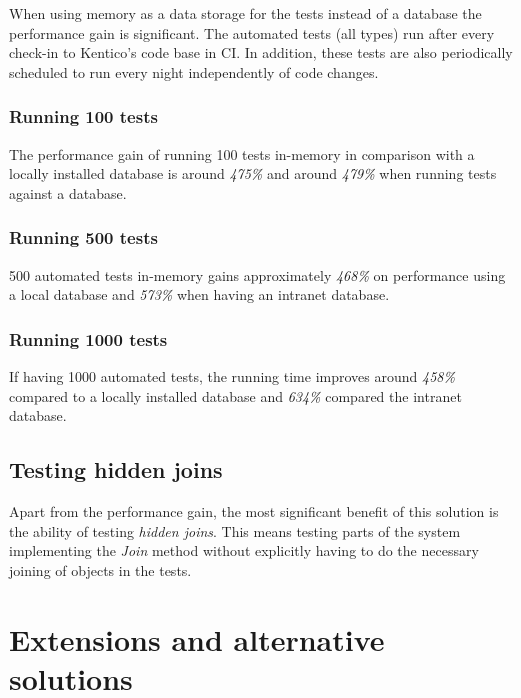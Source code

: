 \documentclass[
  print,
  table,
  nolof,
  nolot,
  nocover,
  oneside
]{fithesis3}
\begin{document}
When using memory as a data storage for the tests instead of a database the performance gain is significant. The automated tests (all types) run after every check-in to Kentico's code base in CI. In addition, these tests are also periodically scheduled to run every night independently of code changes.

\subsubsection{Running 100 tests}
The performance gain of running 100 tests in-memory in comparison with a locally installed database is around \textit{475\%} and around  \textit{479\%} when running tests against a database.

\subsubsection{Running 500 tests}
500 automated tests in-memory gains approximately \textit{468\%} on performance using a local database and \textit{573\%} when having an intranet database.

\subsubsection{Running 1000 tests}
If having 1000 automated tests, the running time improves around \textit{458\%} compared to a locally installed database and \textit{634\%} compared the intranet database.

\subsection{Testing hidden joins}
Apart from the performance gain, the most significant benefit of this solution is the ability of testing \textit{hidden joins}. This means testing parts of the system implementing the \textit{Join} method without explicitly having to do the necessary joining of objects in the tests.


\section{Extensions and alternative solutions}
\label{extensions and alternative solutions}

\end{document}
